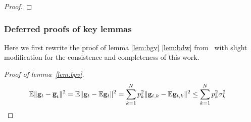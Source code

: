\begin{proof}
\begin{comment}
	\begin{align*}
	(1-\mu\alpha_{t-1})\alpha_{t-1}^{2}+(1-\mu\alpha_{t})(1-\mu\alpha_{t-1})b\alpha_{t-1} & \leq(1-\mu\alpha_{t})\alpha_{t-1}^{2}+(1-\mu\alpha_{t})(1-\mu\alpha_{t-1})b\alpha_{t-1}\\
	& \le(1-\mu\alpha_{t})\alpha_{t-1}(\alpha_{t-1}+(1-\mu\alpha_{t-1})b)\\
	& \leq(1-\mu\alpha_{t})b\alpha_{t}
	\end{align*}
	so that 
	\begin{align*}
	(1-\mu\alpha_{t})\beta\alpha_{t}+\alpha_{t}^{2} & \leq b\alpha_{t+1}\\
	\end{align*}
	\begin{align*}
	(1-\mu\alpha_{t-1})\alpha_{t-1}^{2}+(1-\mu\alpha_{t})(1-\mu\alpha_{t-1})b\alpha_{t-1} & \leq\alpha_{t}^{2}+(1-\mu\alpha_{t-1})\alpha_{t-1}(\alpha_{t-1}+b(1-\mu\alpha_{t}))\le\\
	(\alpha_{t-1}+b(1-\mu\alpha_{t}))\alpha_{t}\leq
	\end{align*}
	\end{proof}
	\end{comment}
\end{proof}

\subsubsection{Deferred proofs of key lemmas}
Here we first rewrite the proof of lemma \ref{lem:bgv} \ref{lem:bdw} from~\cite{li2019convergence} with slight modification for the consistence and completeness of this work. 
\begin{proof}[Proof of lemma~\ref{lem:bgv}]
	\begin{align*}
	\mathbb{E}\|{\mathbf{g}}_{t}-{\overline{\mathbf{g}}}_{t}\|^{2} & =\mathbb{E}\|{\mathbf{g}}_{t}-\mathbb{E}{\mathbf{g}}_{t}\|^{2}=\sum_{k=1}^{N}p_{k}^{2}\|{\mathbf{g}}_{t,k}-\mathbb{E}{\mathbf{g}}_{t,k}\|^{2}\leq \sum_{k=1}^{N}p_{k}^{2}\sigma_{k}^{2}
	\end{align*}
\end{proof}


